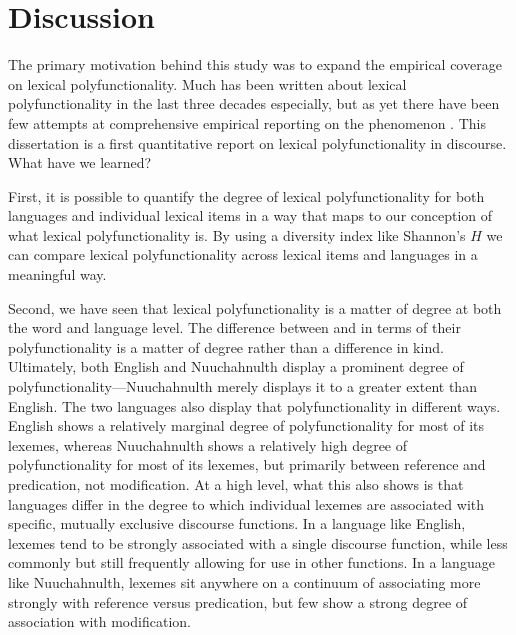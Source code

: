 \section{Discussion}
\label{sec:5.3}

The primary motivation behind this study was to expand the empirical coverage on lexical polyfunctionality. Much has been written about lexical polyfunctionality in the last three decades especially, but as yet there have been few attempts at comprehensive empirical reporting on the phenomenon . This dissertation is a first quantitative report on lexical polyfunctionality in discourse. What have we learned?

First, it is possible to quantify the degree of lexical polyfunctionality for both languages and individual lexical items in a way that maps to our conception of what lexical polyfunctionality is. By using a diversity index like Shannon's $H$ we can compare lexical polyfunctionality across lexical items and languages in a meaningful way.

Second, we have seen that lexical polyfunctionality is a matter of degree at both the word and language level. The difference between  and  in terms of their polyfunctionality is a matter of degree rather than a difference in kind. Ultimately, both English and Nuuchahnulth display a prominent degree of polyfunctionality—Nuuchahnulth merely displays it to a greater extent than English. The two languages also display that polyfunctionality in different ways. English shows a relatively marginal degree of polyfunctionality for most of its lexemes, whereas Nuuchahnulth shows a relatively high degree of polyfunctionality for most of its lexemes, but primarily between reference and predication, not modification. At a high level, what this also shows is that languages differ in the degree to which individual lexemes are associated with specific, mutually exclusive discourse functions. In a language like English, lexemes tend to be strongly associated with a single discourse function, while less commonly but still frequently allowing for use in other functions. In a language like Nuuchahnulth, lexemes sit anywhere on a continuum of associating more strongly with reference versus predication, but few show a strong degree of association with modification.

